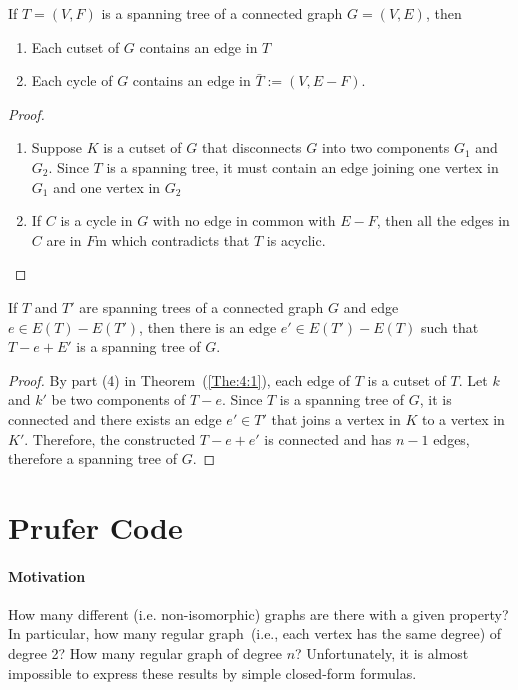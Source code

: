 \begin{theorem}
If $T=(V,F)$ is a spanning tree of a connected graph $G=(V,E)$, then
\begin{enumerate}
\item
Each cutset of $G$ contains an edge in $T$
\item
Each cycle of $G$ contains an edge in $\bar{T}:=(V,E-F)$.
\end{enumerate}
\end{theorem}
\begin{proof}
\begin{enumerate}
\item
Suppose $K$ is a cutset of $G$ that disconnects $G$ into two components $G_1$ and $G_2$.
Since $T$ is a spanning tree, it must contain an edge joining one vertex in $G_1$ and one vertex in $G_2$
\item
If $C$ is a cycle in $G$ with no edge in common with $E-F$, then all the edges in $C$ are in $F$m which contradicts that $T$ is acyclic.
\end{enumerate}
\end{proof}

\begin{theorem}
If $T$ and $T'$ are spanning trees of a connected graph $G$ and edge $e\in E(T)-E(T')$,
then there is an edge $e'\in E(T')-E(T)$ such that $T-e+E'$ is a spanning tree of $G$.
\end{theorem}
\begin{proof}
By part (4) in Theorem~(\ref{The:4:1}), each edge of $T$ is a cutset of $T$.
Let $k$ and $k'$ be two components of $T-e$.
Since $T$ is a spanning tree of $G$, it is connected and there exists an edge $e'\in T'$ that joins a vertex in $K$ to a vertex in $K'$.
Therefore, the constructed $T-e+e'$ is connected and has $n-1$ edges, therefore a spanning tree of $G$.
\end{proof}

\section{Prufer Code}
\paragraph{Motivation}
How many different (i.e. non-isomorphic) graphs are there with a given property?
In particular, how many regular graph~(i.e., each vertex has the same degree) of degree 2?
How many regular graph of degree $n$? Unfortunately, it is almost impossible to express these results by simple closed-form formulas.

